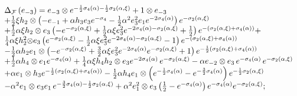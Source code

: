 \documentclass[a4paper,12pt,showkeys]{article}
\begin{document}
\[
\begin{array}{l}
\Delta _{{\cal F}}\left( e_{-3} \right)
 =e_{-3} \otimes e^{-\frac{1}{2}{\bf %
 \sigma }_{4} (\alpha) -\frac{1}{2}{\bf  \sigma }_{2}
  (\alpha, \xi ) }+1\otimes e_{-3}
 \\
+ \frac{1}{2}\xi  h_2 \otimes
\left(  - e_{-1} +
 \alpha  h _{3} e_3 e^{-{\bf \sigma }%
_{4}}-\frac{1}{2}\alpha ^{2} e_3 ^{2}  e_1 e^{-2{\bf  \sigma
}_{4} (\alpha) }\right) e^{-{\bf  \sigma }_{2} (\alpha, \xi ) }
\\
+ \frac{1}{2}\alpha \xi  h_2 \otimes  e_3
\left( -e^{-{\bf  \sigma }_{2} (\alpha, \xi ) }+\frac{1}{2}%
\alpha \xi  e_3 ^{2}e^{-2{\bf  \sigma }_{4}
(\alpha) -{\bf  \sigma }_{2} (\alpha, \xi ) }+\frac{1}{2}%
\right) e^{-\left( {\bf  \sigma }_{2} (\alpha, \xi ) +{\bf
\sigma }_{4} (\alpha) \right) }+
\\
 \frac{1}{4}\alpha \xi  h_2 ^{2}{\bf \otimes } e_3
  \left( e^{-{\bf  \sigma }_{2} (\alpha, \xi ) }-%
\frac{1}{2}\alpha \xi  e_3 ^{2}
e^{-2{\bf  \sigma }_{4} (\alpha)
 -{\bf \sigma }_{2}(\alpha,\xi)}-1\right) e^{-\left( {\bf  \sigma }_{2} (\alpha,
\xi ) +{\bf \sigma }_{4} (\alpha) \right) }
\\
- \frac{1}{2}\alpha  h_2   e_1 \otimes \left( -e^{-{\bf  \sigma }_{2}
(\alpha, \xi ) }+\frac{3}{2}%
\alpha \xi  e_3 ^{2}e^{-2{\bf  \sigma }_{4} (\alpha) }e^{-{\bf \sigma }%
_{2}(\alpha,\xi)}+1\right) e^{-\frac{1}{2}\left( {\bf  \sigma }_{2}
(\alpha, \xi ) +{\bf \sigma }%
_{4}(\alpha)\right) }
\\
+ \frac{1}{2}\alpha  h _{4}\otimes   e_1 e^{-{\bf  \sigma }_{4}
(\alpha) }+ \frac{1}{4}\alpha \xi
 h _{4} h_2 \otimes  e_3 e^{-2{\bf  \sigma }_{4} (\alpha) }
 \,
 e^{-{\bf \sigma }_{2}{(\alpha,\xi)}}
 -
\alpha  e_{-2}
 \otimes
  e_3\,
  e^{-{\bf  \sigma}_{4}(\alpha)}
 \, e^{-{\bf \sigma }_{2}(\alpha, \xi)}
\\
+
\alpha   e_1 \otimes  h _{3}e^{-\frac{1}{2}
\left( {\bf  \sigma }_{2} (\alpha, \xi ) +{\bf %
 \sigma }_{4} (\alpha) \right) }
 - \frac{1}{2}
 \alpha  h _{4} e_1 \otimes \left( e^{-\frac{1}{2}%
{\bf  \sigma }_{4} (\alpha) }-e^{-\frac{3}{2}{\bf  \sigma }_{4} (\alpha) }\right) e^{-\frac{1}{%
2}{\bf  \sigma }_{2} (\alpha, \xi ) }
\\
- \alpha ^{2}  e_1 \otimes  e_3  e_1\,
 e^{-\frac{3}{2}{\bf  \sigma }_{4} (\alpha) -\frac{1%
}{2}{\bf  \sigma }_{2} (\alpha, \xi ) }+\alpha ^{2}  e_1 ^{2}\otimes  e_3 \left( \frac{1}{2}%
-e^{-{\bf  \sigma }_{4} (\alpha) }\right) e^{-{\bf  \sigma }_{4} (\alpha) }e^{-{\bf \sigma }%
_{2}(\alpha,\xi)};%
\end{array}%
\]%
\end{document}
